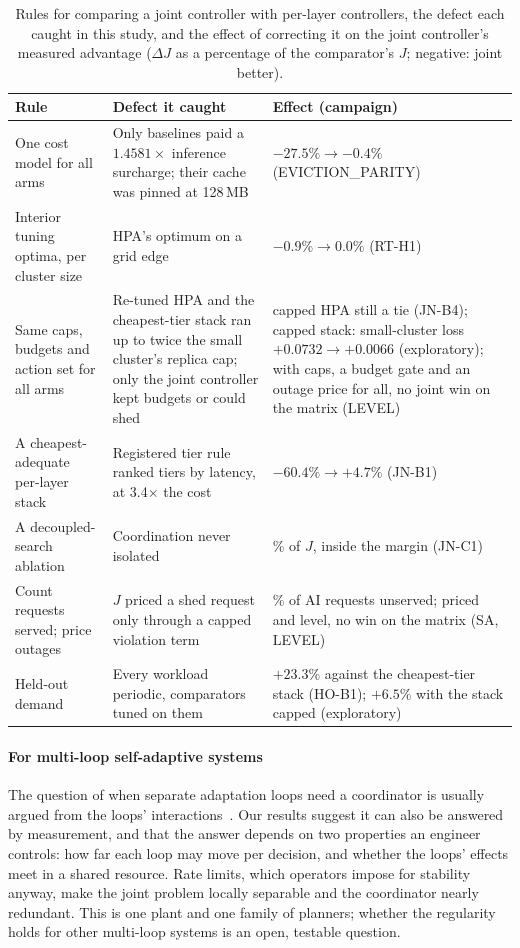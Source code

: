 \begin{table}[t]
\caption{Rules for comparing a joint controller with per-layer
controllers, the defect each caught in this study, and the effect of
correcting it on the joint controller's measured advantage ($\Delta J$ as
a percentage of the comparator's $J$; negative: joint better).}
\label{tab:checklist}
\centering\tablefont
\begin{tabular}{@{}>{\raggedright\arraybackslash}p{}
                >{\raggedright\arraybackslash}p{}
                >{\raggedright\arraybackslash}p{}@{}}
\toprule
Rule & Defect it caught & Effect (campaign) \\
\midrule
One cost model for all arms & Only baselines paid a $1.4581\times$
  inference surcharge; their cache was pinned at 128\,MB &
  $-27.5\%\rightarrow-0.4\%$ (EVICTION\_PARITY) \\
Interior tuning optima, per cluster size & HPA's optimum on a grid edge &
  $-0.9\%\rightarrow0.0\%$ (RT-H1) \\
Same caps, budgets and action set for all arms & Re-tuned HPA and the
  cheapest-tier stack ran up to twice the small cluster's replica cap; only
  the joint controller kept budgets or could shed &
  capped HPA still a tie (JN-B4); capped stack: small-cluster loss
  $+0.0732\rightarrow+0.0066$ (exploratory); with caps, a budget gate and an
  outage price for all, no joint win on the matrix (LEVEL) \\
A cheapest-adequate per-layer stack & Registered tier rule ranked tiers by
  latency, at 3.4$\times$ the cost & $-60.4\%\rightarrow+4.7\%$ (JN-B1) \\
A decoupled-search ablation & Coordination never isolated &
  1.6\% of $J$, inside the margin (JN-C1) \\
Count requests served; price outages & $J$ priced a shed request only
  through a capped violation term & 10.1\% of AI requests unserved; priced
  and level, no win on the matrix (SA, LEVEL) \\
Held-out demand & Every workload periodic, comparators tuned on them &
  $+23.3\%$ against the cheapest-tier stack (HO-B1); $+6.5\%$ with the stack
  capped (exploratory) \\
\bottomrule
\end{tabular}
\end{table}

\paragraph{For multi-loop self-adaptive systems}
The question of when separate adaptation loops need a coordinator is
usually argued from the loops' interactions~\cite{weyns2013,kephart2007}.
Our results suggest it can also be answered by measurement, and that the
answer depends on two properties an engineer controls: how far each loop
may move per decision, and whether the loops' effects meet in a shared
resource. Rate limits, which operators impose for stability anyway, make
the joint problem locally separable and the coordinator nearly redundant.
This is one plant and one family of planners; whether the regularity holds
for other multi-loop systems is an open, testable question.
